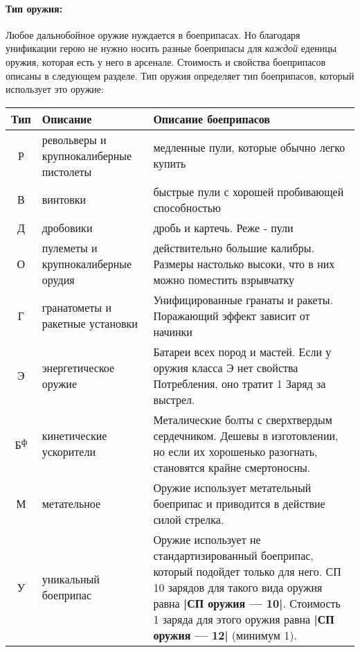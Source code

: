 \paragraph{Тип оружия:} Любое дальнобойное оружие нуждается в боеприпасах. Но благодаря унификации герою не нужно носить разные боеприпасы для \textit{каждой} еденицы оружия, которая есть у него в арсенале. Стоимость и свойства боеприпасов описаны в следующем разделе. Тип оружия определяет тип боеприпасов, который использует это оружие:
\begin{center}
\begin{tabular}{|c|p{3cm}|p{10cm}|}
\hline
Тип & Описание & Описание боеприпасов\\ \hline
Р & револьверы и крупнокалиберные пистолеты & медленные пули, которые обычно легко купить\\ \hline
В & винтовки & быстрые пули с хорошей пробивающей способностью\\ \hline
Д & дробовики & дробь и картечь. Реже - пули\\ \hline
О & пулеметы и крупнокалиберные орудия & действительно большие калибры. Размеры настолько высоки, что в них можно поместить взрывчатку\\ \hline
Г & гранатометы и ракетные установки & Унифицированные гранаты и ракеты. Поражающий эффект зависит от начинки\\ \hline
Э & энергетическое оружие & Батареи всех пород и мастей. Если у оружия класса Э нет свойства Потребления, оно тратит 1 Заряд за выстрел.\\ \hline
Б\textsuperscript{ф} & кинетические ускорители & Металические болты с сверхтвердым сердечником. Дешевы в изготовлении, но если их хорошенько разогнать, становятся крайне смертоносны.\\ \hline
М & метательное & Оружие использует метательный боеприпас и приводится в действие силой стрелка. \\ \hline
У & уникальный боеприпас & Оружие использует не стандартизированный боеприпас, который подойдет только для него. СП 10 зарядов для такого вида оружия равна \textbf{|СП оружия — 10|}. Стоимость 1 заряда для этого оружия равна \textbf{|СП оружия — 12|} (минимум 1). \\ \hline
\end{tabular}
\end{center}
